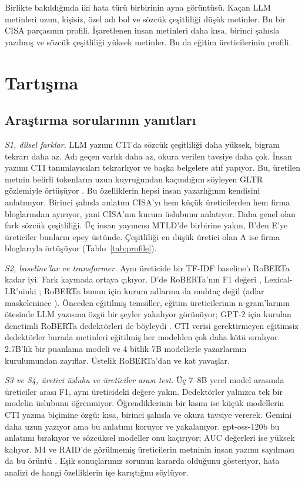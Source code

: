 \documentclass[journal]{IEEEtran}
\begin{document}
Birlikte bakıldığında iki hata türü birbirinin ayna görüntüsü. Kaçan LLM metinleri uzun, kişisiz, özel adı bol ve
sözcük çeşitliliği düşük metinler. Bu bir CISA parçasının profili. İşaretlenen insan metinleri daha kısa, birinci
şahısla yazılmış ve sözcük çeşitliliği yüksek metinler. Bu da eğitim üreticilerinin profili.

\section{Tartışma}\label{sec:discussion}
\subsection{Araştırma sorularının yanıtları}
\emph{S1, dilsel farklar.} LLM yazımı CTI'da sözcük çeşitliliği daha yüksek, bigram tekrarı daha az. Adı geçen
varlık daha az, okura verilen tavsiye daha çok. İnsan yazımı CTI tanımlayıcıları tekrarlıyor ve başka belgelere
atıf yapıyor. Bu, üretilen metnin belirli tokenların uzun kuyruğundan kaçındığını söyleyen GLTR gözlemiyle
örtüşüyor \cite{Gehrmann_2019}. Bu özelliklerin hepsi insan yazarlığının kendisini anlatmıyor. Birinci şahısla
anlatım CISA'yı hem küçük üreticilerden hem firma bloglarından ayırıyor, yani CISA'nın kurum üslubunu anlatıyor.
Daha genel olan fark sözcük çeşitliliği. Üç insan yayıncısı MTLD'de birbirine yakın, B'den E'ye üreticiler
bunların epey üstünde. Çeşitliliği en düşük üretici olan A ise firma bloglarıyla örtüşüyor
(Tablo~\ref{tab:profile}).

\emph{S2, baseline'lar ve transformer.} Aynı üreticide bir TF-IDF baseline'ı RoBERTa kadar iyi. Fark kaymada ortaya
çıkıyor. D'de RoBERTa'nın F1 değeri \FoneDTrans{}, Lexical-LR'ninki \FoneDLexLR{}; RoBERTa bunun için kurum
adlarına da muhtaç değil (adlar maskelenince \AblTransformerMaskedD{}). Önceden eğitilmiş temsiller, eğitim
üreticilerinin n-gram'larının ötesinde LLM yazısına özgü bir şeyler yakalıyor görünüyor; GPT-2 için kurulan
denetimli RoBERTa dedektörleri de böyleydi \cite{Solaiman_2019}. CTI verisi gerektirmeyen eğitimsiz dedektörler
burada metinleri eğitilmiş her modelden çok daha kötü sıralıyor. 2.7B'lik bir puanlama modeli ve 4 bitlik 7B
modellerle yazarlarının kurulumundan zayıflar. Üstelik RoBERTa'dan \RelFast{} ve \RelBino{} kat yavaşlar.

\emph{S3 ve S4, üretici üslubu ve üreticiler arası test.} Üç 7--8B yerel model arasında üreticiler arası F1, aynı
üreticideki değere yakın. Dedektörler yalnızca tek bir modelin üslubunu öğrenmiyor. Öğrendiklerinin bir kısmı ise
küçük modellerin CTI yazma biçimine özgü: kısa, birinci şahısla ve okura tavsiye vererek. Gemini daha uzun yazıyor
ama bu anlatımı koruyor ve yakalanıyor. gpt-oss-120b bu anlatımı bırakıyor ve sözcüksel modeller onu kaçırıyor;
AUC değerleri ise yüksek kalıyor. M4 ve RAID'de görülmemiş üreticilerin metninin insan yazımı sayılması da bu
örüntü \cite{Wang_2024,Dugan_2024}. Eşik sonuçlarımız sorunun kararda olduğunu gösteriyor, hata analizi de hangi
özelliklerin işe karıştığını söylüyor.
\end{document}
